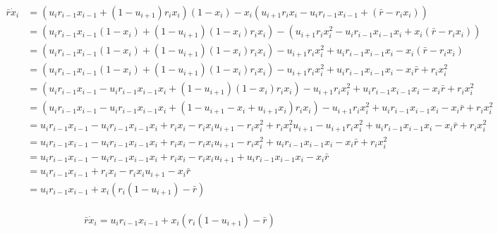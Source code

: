 \documentclass[a4paper]{article}
\begin{document}
\begin{align*}
\bar{r} \dot{x} _i & = \left(u_i r_{i-1} x_{i-1} + \left(1 - u_{i+1} \right) r_i x_i \right) ( 1- x_i) - x_i \left( u_{i+1} r_{i} x_{i} - u_i r_{i-1} x_{i-1} + ( \bar{r} - r_i x_i ) \right) \\
& =  \left(u_i r_{i-1} x_{i-1} ( 1- x_i) + \left(1 - u_{i+1} \right) ( 1- x_i)  r_i x_i \right)  -  \left( u_{i+1} r_{i} x ^2_{i} - u_i r_{i-1} x_{i-1} x_i + x_i ( \bar{r} - r_i x_i ) \right) \\
& = \left(u_i r_{i-1} x_{i-1} ( 1- x_i) + \left(1 - u_{i+1} \right) ( 1- x_i)  r_i x_i \right)  -  u_{i+1} r_{i} x ^2_{i} + u_i r_{i-1} x_{i-1} x_i - x_i ( \bar{r} - r_i x_i ) \\
& = \left(u_i r_{i-1} x_{i-1} ( 1- x_i) + \left(1 - u_{i+1} \right) ( 1- x_i)  r_i x_i \right)  -  u_{i+1} r_{i} x ^2_{i} + u_i r_{i-1} x_{i-1} x_i - x_i  \bar{r} + r_i x_i ^2 \\
& = \left(u_i r_{i-1} x_{i-1} - u_i r_{i-1} x_{i-1} x_i + \left(1 - u_{i+1} \right) ( 1- x_i)  r_i x_i \right)  -  u_{i+1} r_{i} x ^2_{i} + u_i r_{i-1} x_{i-1} x_i - x_i  \bar{r} + r_i x_i ^2 \\
& = \left(u_i r_{i-1} x_{i-1} - u_i r_{i-1} x_{i-1} x_i + \left( 1 - u_{i+1} - x_i + u_{i+1} x_i \right)  r_i x_i \right)  -  u_{i+1} r_{i} x ^2_{i} + u_i r_{i-1} x_{i-1} x_i - x_i  \bar{r} + r_i x_i ^2 \\
& = u_i r_{i-1} x_{i-1} - u_i r_{i-1} x_{i-1} x_i +  r_i x_i - r_i x_i u_{i+1} - r_i x^2_i + r_i x ^2_i u_{i+1}  -  u_{i+1} r_{i} x ^2_{i} + u_i r_{i-1} x_{i-1} x_i - x_i  \bar{r} + r_i x_i ^2 \\
& = u_i r_{i-1} x_{i-1} - u_i r_{i-1} x_{i-1} x_i +  r_i x_i - r_i x_i u_{i+1} - r_i x^2_i  + u_i r_{i-1} x_{i-1} x_i - x_i  \bar{r} + r_i x_i ^2 \\
& = u_i r_{i-1} x_{i-1} - u_i r_{i-1} x_{i-1} x_i +  r_i x_i - r_i x_i u_{i+1} + u_i r_{i-1} x_{i-1} x_i - x_i  \bar{r} \\
& = u_i r_{i-1} x_{i-1}  +  r_i x_i - r_i x_i u_{i+1}  - x_i  \bar{r} \\
& = u_i r_{i-1} x_{i-1} + x_i \left( r_i  \left( 1- u_{i+1} \right) - \bar{r} \right) \\ 
\end{align*}

\begin{equation}
\bar{r} \dot{x} _i = u_i r_{i-1} x_{i-1} + x_i \left( r_i  \left( 1- u_{i+1} \right) - \bar{r} \right)
\end{equation}
\end{document}
